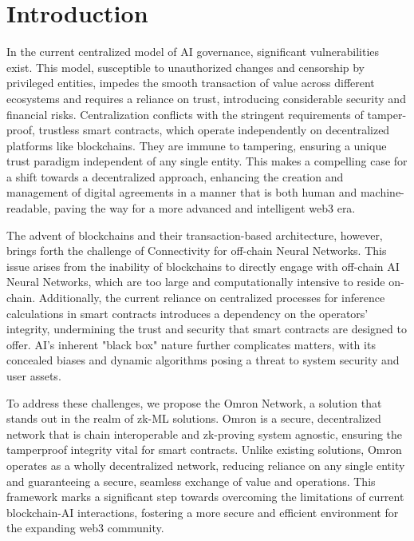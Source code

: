 \documentclass[conference]{IEEEtran}
\begin{document}


\section{Introduction}
In the current centralized model of AI governance, significant vulnerabilities exist. This model, susceptible to unauthorized changes and censorship by privileged entities, impedes the smooth transaction of value across different ecosystems and requires a reliance on trust, introducing considerable security and financial risks. Centralization conflicts with the stringent requirements of tamper-proof, trustless smart contracts, which operate independently on decentralized platforms like blockchains. They are immune to tampering, ensuring a unique trust paradigm independent of any single entity. This makes a compelling case for a shift towards a decentralized approach, enhancing the creation and management of digital agreements in a manner that is both human and machine-readable, paving the way for a more advanced and intelligent web3 era.

The advent of blockchains and their transaction-based architecture, however, brings forth the challenge of Connectivity for off-chain Neural Networks.  This issue arises from the inability of blockchains to directly engage with off-chain AI Neural Networks, which are too large and computationally intensive to reside on-chain. Additionally, the current reliance on centralized processes for inference calculations in smart contracts introduces a dependency on the operators' integrity, undermining the trust and security that smart contracts are designed to offer. AI's inherent "black box" nature further complicates matters, with its concealed biases and dynamic algorithms posing a threat to system security and user assets.

To address these challenges, we propose the Omron Network, a solution that stands out in the realm of zk-ML solutions. Omron is a secure, decentralized network that is chain interoperable and zk-proving system agnostic, ensuring the tamperproof integrity vital for smart contracts. Unlike existing solutions, Omron operates as a wholly decentralized network, reducing reliance on any single entity and guaranteeing a secure, seamless exchange of value and operations. This framework marks a significant step towards overcoming the limitations of current blockchain-AI interactions, fostering a more secure and efficient environment for the expanding web3 community.
\end{document}
